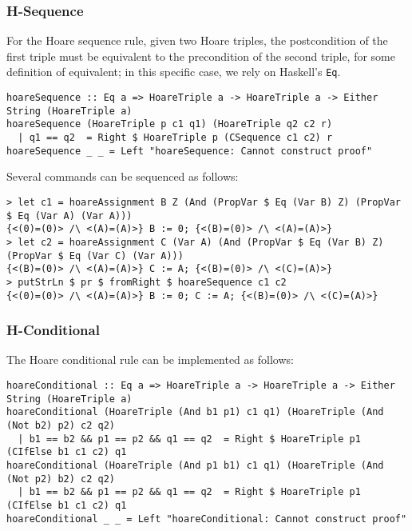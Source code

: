 \documentclass{article}
\begin{document}
\subsubsection{H-Sequence}

For the Hoare sequence rule, given two Hoare triples, the postcondition of the first triple must be equivalent to the precondition of the second triple, for some definition of equivalent; in this specific case, we rely on Haskell's \texttt{Eq}.

\begin{lstlisting}
hoareSequence :: Eq a => HoareTriple a -> HoareTriple a -> Either String (HoareTriple a)
hoareSequence (HoareTriple p c1 q1) (HoareTriple q2 c2 r)
  | q1 == q2  = Right $ HoareTriple p (CSequence c1 c2) r
hoareSequence _ _ = Left "hoareSequence: Cannot construct proof"
\end{lstlisting}

Several commands can be sequenced as follows:

\begin{lstlisting}
> let c1 = hoareAssignment B Z (And (PropVar $ Eq (Var B) Z) (PropVar $ Eq (Var A) (Var A)))
{<(0)=(0)> /\ <(A)=(A)>} B := 0; {<(B)=(0)> /\ <(A)=(A)>}
> let c2 = hoareAssignment C (Var A) (And (PropVar $ Eq (Var B) Z) (PropVar $ Eq (Var C) (Var A)))
{<(B)=(0)> /\ <(A)=(A)>} C := A; {<(B)=(0)> /\ <(C)=(A)>}
> putStrLn $ pr $ fromRight $ hoareSequence c1 c2
{<(0)=(0)> /\ <(A)=(A)>} B := 0; C := A; {<(B)=(0)> /\ <(C)=(A)>}
\end{lstlisting}

\subsubsection{H-Conditional}

The Hoare conditional rule can be implemented as follows:

\begin{lstlisting}
hoareConditional :: Eq a => HoareTriple a -> HoareTriple a -> Either String (HoareTriple a)
hoareConditional (HoareTriple (And b1 p1) c1 q1) (HoareTriple (And (Not b2) p2) c2 q2)
  | b1 == b2 && p1 == p2 && q1 == q2  = Right $ HoareTriple p1 (CIfElse b1 c1 c2) q1
hoareConditional (HoareTriple (And p1 b1) c1 q1) (HoareTriple (And (Not p2) b2) c2 q2)
  | b1 == b2 && p1 == p2 && q1 == q2  = Right $ HoareTriple p1 (CIfElse b1 c1 c2) q1
hoareConditional _ _ = Left "hoareConditional: Cannot construct proof"
\end{lstlisting}
\end{document}
